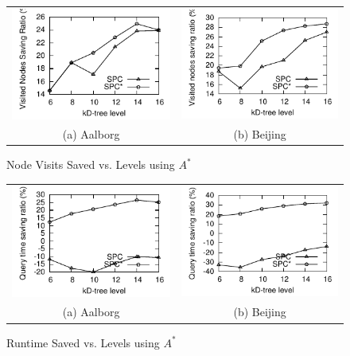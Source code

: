 \begin{figure}[htb]
\center
  \begin{tabular}{@{}c@{ }c@{}}
     \includegraphics[width=0.5\columnwidth]{figures/split_diffnodes_aal_server_astar.pdf}
     &
     \includegraphics[width=0.5\columnwidth]{figures/split_diffnodes_bei_server_astar.pdf}
      \\
     (a) Aalborg & (b)  Beijing
     \end{tabular}
\caption{Node Visits Saved vs. Levels  using $A^*$}
\label{fig:split_diffnodes_server_astar}
\end{figure}



\begin{figure}[htb]
\center
  \begin{tabular}{@{}c@{ }c@{}}
     \includegraphics[width=0.5\columnwidth]{figures/split_diffruntime_aal_server_astar.pdf}
     &
     \includegraphics[width=0.5\columnwidth]{figures/split_diffruntime_bei_server_astar.pdf}
      \\
     (a) Aalborg & (b)  Beijing
     \end{tabular}
\caption{Runtime Saved vs. Levels using $A^*$}
\label{fig:split_diffruntime_server_astar}
\end{figure}






